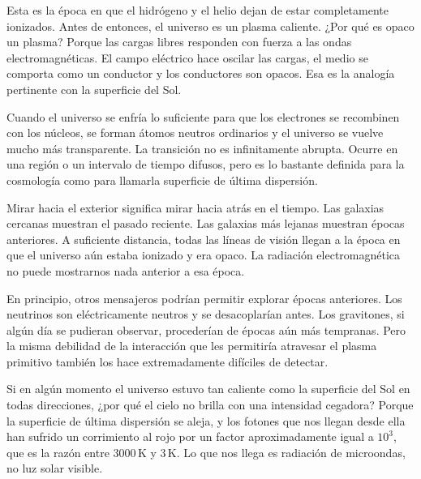 Esta es la época en que el hidrógeno y el helio dejan de estar completamente ionizados. Antes de entonces, el universo es un plasma caliente. ¿Por qué es opaco un plasma? Porque las cargas libres responden con fuerza a las ondas electromagnéticas. El campo eléctrico hace oscilar las cargas, el medio se comporta como un conductor y los conductores son opacos. Esa es la analogía pertinente con la superficie del Sol.

Cuando el universo se enfría lo suficiente para que los electrones se recombinen con los núcleos, se forman átomos neutros ordinarios y el universo se vuelve mucho más transparente. La transición no es infinitamente abrupta. Ocurre en una región o un intervalo de tiempo difusos, pero es lo bastante definida para la cosmología como para llamarla superficie de última dispersión.

Mirar hacia el exterior significa mirar hacia atrás en el tiempo. Las galaxias cercanas muestran el pasado reciente. Las galaxias más lejanas muestran épocas anteriores. A suficiente distancia, todas las líneas de visión llegan a la época en que el universo aún estaba ionizado y era opaco. La radiación electromagnética no puede mostrarnos nada anterior a esa época.

En principio, otros mensajeros podrían permitir explorar épocas anteriores. Los neutrinos son eléctricamente neutros y se desacoplarían antes. Los gravitones, si algún día se pudieran observar, procederían de épocas aún más tempranas. Pero la misma debilidad de la interacción que les permitiría atravesar el plasma primitivo también los hace extremadamente difíciles de detectar.

Si en algún momento el universo estuvo tan caliente como la superficie del Sol en todas direcciones, ¿por qué el cielo no brilla con una intensidad cegadora? Porque la superficie de última dispersión se aleja, y los fotones que nos llegan desde ella han sufrido un corrimiento al rojo por un factor aproximadamente igual a \(10^3\), que es la razón entre \(3000\,\mathrm K\) y \(3\,\mathrm K\). Lo que nos llega es radiación de microondas, no luz solar visible.

\begin{classroomqa}
\end{classroomqa}


